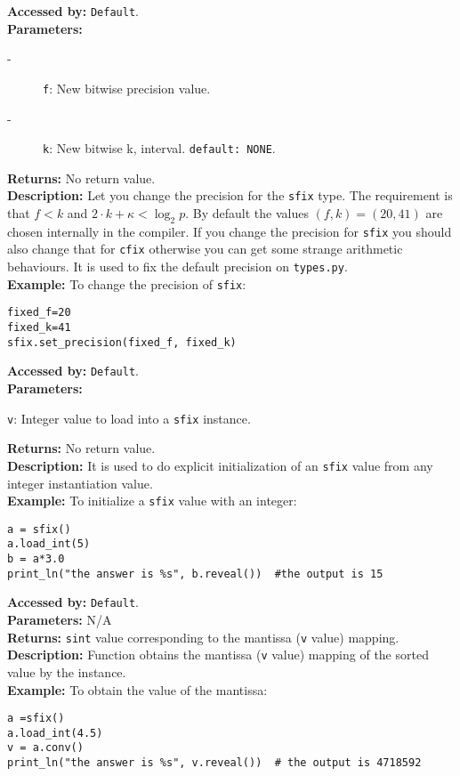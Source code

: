 			\textbf{Accessed by:} \verb|Default|.\\
    		\textbf{Parameters:}
     		\begin{description}
	     		\item[-] \verb|f|: New bitwise precision  value.
	    		\item[-] \verb|k|: New bitwise k, interval. \verb|default: NONE|.
    		\end{description}
    		\textbf{Returns:} No return value. \\
     		\textbf{Description:}
				Let you change the precision for the \verb|sfix| type. 
                                The requirement is that $f<k$ and $2 \cdot k + \kappa < \log_2 p$.
                                By default the values $(f,k)=(20,41)$ are chosen internally in the compiler.
                                If you change the precision for \verb|sfix| you should also change that for
                                \verb|cfix| otherwise you can get some strange arithmetic behaviours. 
                                It is used to fix the default precision on \verb|types.py|.  \\
			\textbf{Example:}
				To change the precision of \verb|sfix|:
\begin{lstlisting}
fixed_f=20
fixed_k=41
sfix.set_precision(fixed_f, fixed_k)
\end{lstlisting}
     			
			\textbf{Accessed by:} \verb|Default|.		 \\
			\textbf{Parameters:}
			\begin{description}
				\item \verb|v|: Integer value to load into a \verb|sfix| instance.
			\end{description}
			\textbf{Returns:} No return value. \\
			\textbf{Description:}
				 It is used to do explicit initialization of an \verb|sfix| value from any integer instantiation value. \\
	     	\textbf{Example:}
    		    To initialize a \verb|sfix| value with an integer:
\begin{lstlisting}
a = sfix()
a.load_int(5)
b = a*3.0
print_ln("the answer is %s", b.reveal())  #the output is 15   	
\end{lstlisting}	 
			\textbf{Accessed by:} \verb|Default|.		 \\
			\textbf{Parameters:} N/A \\
			\textbf{Returns:} \verb|sint| value corresponding to the mantissa (\verb|v| value) mapping. \\
			\textbf{Description:}
				Function obtains the mantissa (\verb|v| value) mapping of the sorted value by the instance. \\
	     	\textbf{Example:}
    		    To obtain the value of the mantissa:
\begin{lstlisting}
a =sfix()
a.load_int(4.5)
v = a.conv()
print_ln("the answer is %s", v.reveal())  # the output is 4718592   	
\end{lstlisting}	 
		
